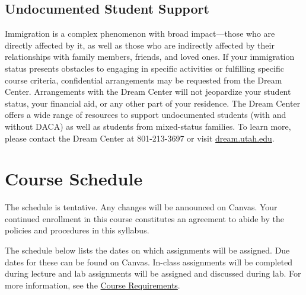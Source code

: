 \documentclass[
  letterpaper,
]{article}
\begin{document}
\subsection{Undocumented Student
Support}\label{undocumented-student-support}

Immigration is a complex phenomenon with broad impact---those who are
directly affected by it, as well as those who are indirectly affected by
their relationships with family members, friends, and loved ones. If
your immigration status presents obstacles to engaging in specific
activities or fulfilling specific course criteria, confidential
arrangements may be requested from the Dream Center. Arrangements with
the Dream Center will not jeopardize your student status, your financial
aid, or any other part of your residence. The Dream Center offers a wide
range of resources to support undocumented students (with and without
DACA) as well as students from mixed-status families. To learn more,
please contact the Dream Center at 801-213-3697 or visit
\href{http://dream.utah.edu/}{dream.utah.edu}.

\section{Course Schedule}\label{course-schedule}

The schedule is tentative. Any changes will be announced on Canvas. Your
continued enrollment in this course constitutes an agreement to abide by
the policies and procedures in this syllabus.

\begin{tcolorbox}[enhanced jigsaw, breakable, coltitle=black, opacityback=0, rightrule=.15mm, colframe=quarto-callout-note-color-frame, bottomtitle=1mm, opacitybacktitle=0.6, bottomrule=.15mm, left=2mm, toptitle=1mm, titlerule=0mm, title=\textcolor{quarto-callout-note-color}{\faInfo}\hspace{0.5em}{Note}, colback=white, arc=.35mm, toprule=.15mm, leftrule=.75mm, colbacktitle=quarto-callout-note-color!10!white]

The schedule below lists the dates on which assignments will be
assigned. Due dates for these can be found on Canvas. In-class
assignments will be completed during lecture and lab assignments will be
assigned and discussed during lab. For more information, see the
\hyperref[sec-requirements]{Course Requirements}.

\end{tcolorbox}
\end{document}
